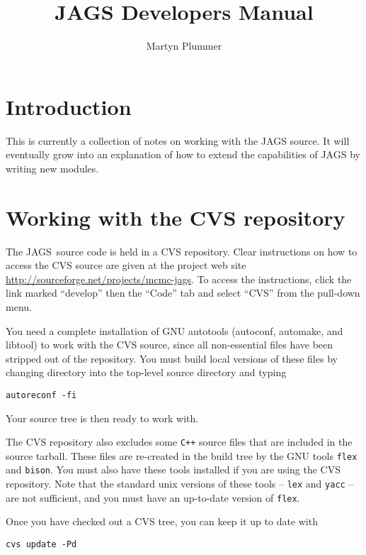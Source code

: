 \documentclass[11pt, a4paper, titlepage]{report}
\newcommand{\JAGS}{\textsf{JAGS}}
\begin{document}
\title{JAGS Developers Manual}
\author{Martyn Plummer}
\maketitle

\tableofcontents

\chapter{Introduction}

This is currently a collection of notes on working with the JAGS
source. It will eventually grow into an explanation of how to extend
the capabilities of JAGS by writing new modules.

\chapter{Working with the CVS repository}

The \JAGS\ source code is held in a CVS repository.  Clear
instructions on how to access the CVS source are given at the project
web site \url{http://sourceforge.net/projects/mcmc-jags}. To access
the instructions, click the link marked ``develop'' then the ``Code''
tab and select ``CVS'' from the pull-down menu.

You need a complete installation of GNU autotools (autoconf, automake,
and libtool) to work with the CVS source, since all non-essential
files have been stripped out of the repository. You must build local
versions of these files by changing directory into the top-level
source directory and typing
\begin{verbatim}
autoreconf -fi
\end{verbatim}
Your source tree is then ready to work with.  

The CVS repository also excludes some \texttt{C++} source files that are
included in the source tarball. These files are re-created in the
build tree by the GNU tools \verb+flex+ and \verb+bison+. You must
also have these tools installed if you are using the CVS
repository. Note that the standard unix versions of these tools --
\verb+lex+ and \verb+yacc+ -- are not sufficient, and you must have an
up-to-date version of \verb+flex+.

Once you have checked out a CVS tree, you can keep it up to date with
\begin{verbatim}
cvs update -Pd
\end{verbatim}
\end{document}
